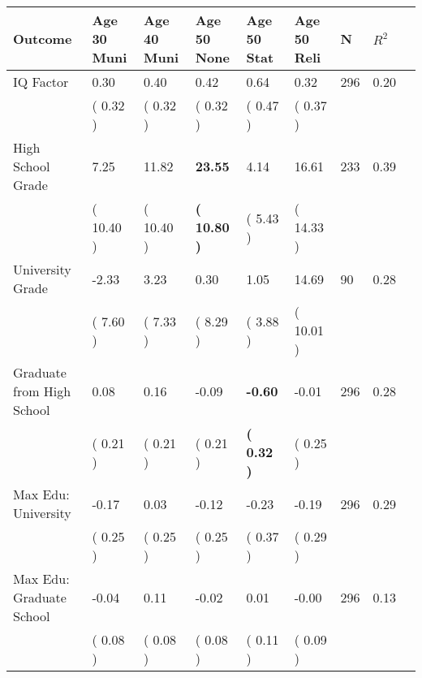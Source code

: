 \begin{tabular}{L{6.2cm} C{1.8cm} C{1.8cm} C{1.8cm} C{1.8cm} C{1.8cm} C{1.8cm} C{0.3cm} C{0.3cm}}
\toprule
 \textbf{Outcome} & \textbf{Age 30 Muni} & \textbf{Age 40 Muni} & \textbf{Age 50 None} & \textbf{Age 50 Stat} & \textbf{Age 50 Reli} & \textbf{N} & \textbf{$ R^2$} \\
\midrule
IQ Factor &      0.30 &      0.40 &      0.42 &      0.64 &      0.32  & 296 &       0.20 \\ 
 & (     0.32 ) & (     0.32 ) & (     0.32 ) & (     0.47 ) & (     0.37 )  & \\
High School Grade &      7.25 &     11.82 & \textbf{    23.55} &      4.14 &     16.61  & 233 &       0.39 \\ 
 & (    10.40 ) & (    10.40 ) & \textbf{(    10.80 )} & (     5.43 ) & (    14.33 )  & \\
University Grade &     -2.33 &      3.23 &      0.30 &      1.05 &     14.69  & 90 &       0.28 \\ 
 & (     7.60 ) & (     7.33 ) & (     8.29 ) & (     3.88 ) & (    10.01 )  & \\
Graduate from High School &      0.08 &      0.16 &     -0.09 & \textbf{    -0.60} &     -0.01  & 296 &       0.28 \\ 
 & (     0.21 ) & (     0.21 ) & (     0.21 ) & \textbf{(     0.32 )} & (     0.25 )  & \\
Max Edu: University &     -0.17 &      0.03 &     -0.12 &     -0.23 &     -0.19  & 296 &       0.29 \\ 
 & (     0.25 ) & (     0.25 ) & (     0.25 ) & (     0.37 ) & (     0.29 )  & \\
Max Edu: Graduate School &     -0.04 &      0.11 &     -0.02 &      0.01 &     -0.00  & 296 &       0.13 \\ 
 & (     0.08 ) & (     0.08 ) & (     0.08 ) & (     0.11 ) & (     0.09 )  & \\
\bottomrule
\end{tabular}
